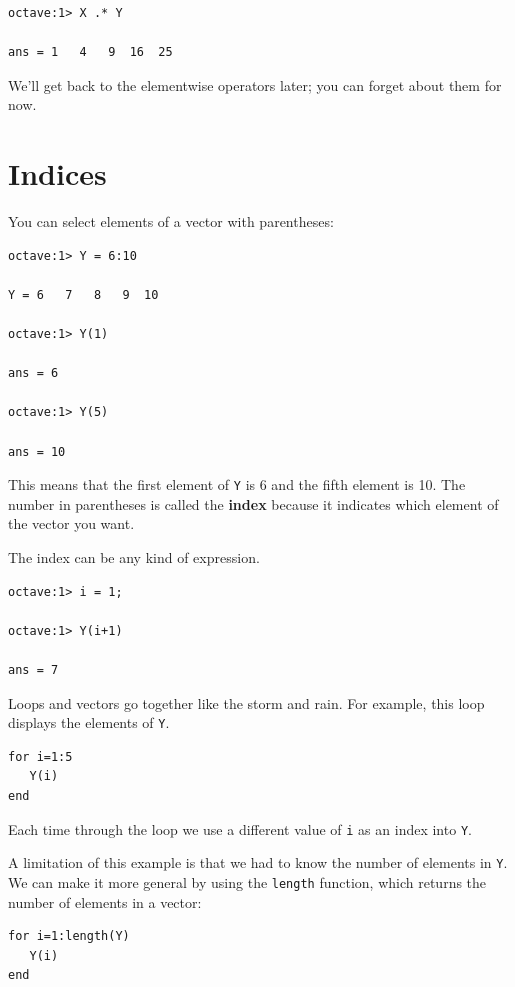 \documentclass{book}
\begin{document}
\begin{verbatim}
octave:1> X .* Y

ans = 1   4   9  16  25
\end{verbatim}

We'll get back to the elementwise operators later; you can
forget about them for now.




\section{Indices}

You can select elements of a vector with parentheses:

\begin{verbatim}
octave:1> Y = 6:10

Y = 6   7   8   9  10

octave:1> Y(1)

ans = 6

octave:1> Y(5)

ans = 10
\end{verbatim}

This means that the first element of {\tt Y} is 6 and the
fifth element is 10. The number in parentheses is called
the {\bf index} because it indicates which element of the
vector you want.

The index can be any kind of expression.

\begin{verbatim}
octave:1> i = 1;

octave:1> Y(i+1)

ans = 7
\end{verbatim}

Loops and vectors go together like the storm and rain.
For example, this loop displays the elements of {\tt Y}.

\begin{verbatim}
for i=1:5
   Y(i)
end
\end{verbatim}

Each time through the loop we use a different value of {\tt i}
as an index into {\tt Y}.

A limitation of this example is that we had to know the number
of elements in {\tt Y}. We can make it more general by using
the {\tt length} function, which returns the number of elements
in a vector:

\begin{verbatim}
for i=1:length(Y)
   Y(i)
end
\end{verbatim}
\end{document}
